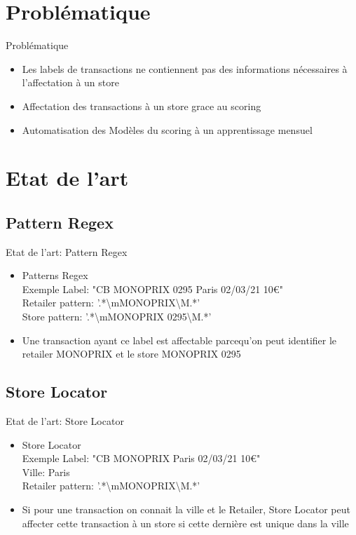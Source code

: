 \documentclass{beamer}
\begin{document}
\section{Problématique}
\begin{frame}{Problématique}
\begin{itemize}
		\item Les labels de transactions ne contiennent pas des informations nécessaires à l'affectation à un store
		\item Affectation des transactions à un store grace au scoring
		\item Automatisation des Modèles du scoring à un apprentissage mensuel
\end{itemize}
\end{frame} 

\section{Etat de l'art}
\subsection{Pattern Regex}
\begin{frame}{Etat de l'art: Pattern Regex}
\begin{itemize}
		\item Patterns Regex \\
				Exemple Label: "CB MONOPRIX 0295 Paris 02/03/21 10€" \\
				Retailer pattern: '.*\textbackslash mMONOPRIX\textbackslash M.*'\\
				Store pattern: '.*\textbackslash mMONOPRIX 0295\textbackslash M.*'
		\item Une transaction ayant ce label est affectable parcequ'on peut identifier le retailer MONOPRIX et le store MONOPRIX 0295
\end{itemize}
\end{frame} 
\subsection{Store Locator}
\begin{frame}{Etat de l'art: Store Locator}
\begin{itemize}
		\item Store Locator \\
				Exemple Label: "CB MONOPRIX Paris 02/03/21 10€" \\
				Ville: Paris\\
				Retailer pattern: '.*\textbackslash mMONOPRIX\textbackslash M.*'\\
		\item Si pour une transaction on connait la ville et le Retailer, Store Locator peut affecter cette transaction à un store si cette dernière est unique dans la ville
\end{itemize}
\end{frame} 
\end{document}
